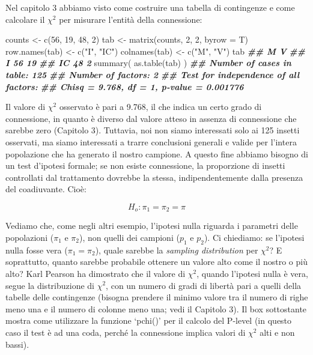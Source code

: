 \documentclass[
  12pt,
]{book}
\newenvironment{Shaded}{\begin{snugshade}}{\end{snugshade}}
\newcommand{\AttributeTok}[1]{\textcolor[rgb]{0.77,0.63,0.00}{#1}}
\newcommand{\DecValTok}[1]{\textcolor[rgb]{0.00,0.00,0.81}{#1}}
\newcommand{\DocumentationTok}[1]{\textcolor[rgb]{0.56,0.35,0.01}{\textbf{\textit{#1}}}}
\newcommand{\FunctionTok}[1]{\textcolor[rgb]{0.00,0.00,0.00}{#1}}
\newcommand{\NormalTok}[1]{#1}
\newcommand{\OtherTok}[1]{\textcolor[rgb]{0.56,0.35,0.01}{#1}}
\newcommand{\StringTok}[1]{\textcolor[rgb]{0.31,0.60,0.02}{#1}}
\begin{document}
Nel capitolo 3 abbiamo visto come costruire una tabella di contingenze e come calcolare il \(\chi^2\) per misurare l'entità della connessione:

\begin{Shaded}
\begin{Highlighting}[]
\NormalTok{counts }\OtherTok{\textless{}{-}} \FunctionTok{c}\NormalTok{(}\DecValTok{56}\NormalTok{, }\DecValTok{19}\NormalTok{, }\DecValTok{48}\NormalTok{, }\DecValTok{2}\NormalTok{)}
\NormalTok{tab }\OtherTok{\textless{}{-}} \FunctionTok{matrix}\NormalTok{(counts, }\DecValTok{2}\NormalTok{, }\DecValTok{2}\NormalTok{, }\AttributeTok{byrow =}\NormalTok{ T)}
\FunctionTok{row.names}\NormalTok{(tab) }\OtherTok{\textless{}{-}} \FunctionTok{c}\NormalTok{(}\StringTok{"I"}\NormalTok{, }\StringTok{"IC"}\NormalTok{)}
\FunctionTok{colnames}\NormalTok{(tab) }\OtherTok{\textless{}{-}} \FunctionTok{c}\NormalTok{(}\StringTok{"M"}\NormalTok{, }\StringTok{"V"}\NormalTok{)}
\NormalTok{tab}
\DocumentationTok{\#\#     M  V}
\DocumentationTok{\#\# I  56 19}
\DocumentationTok{\#\# IC 48  2}
\FunctionTok{summary}\NormalTok{( }\FunctionTok{as.table}\NormalTok{(tab) )}
\DocumentationTok{\#\# Number of cases in table: 125 }
\DocumentationTok{\#\# Number of factors: 2 }
\DocumentationTok{\#\# Test for independence of all factors:}
\DocumentationTok{\#\#  Chisq = 9.768, df = 1, p{-}value = 0.001776}
\end{Highlighting}
\end{Shaded}

Il valore di \(\chi^2\) osservato è pari a 9.768, il che indica un certo grado di connessione, in quanto è diverso dal valore atteso in assenza di connessione che sarebbe zero (Capitolo 3). Tuttavia, noi non siamo interessati solo ai 125 insetti osservati, ma siamo interessati a trarre conclusioni generali e valide per l'intera popolazione che ha generato il nostro campione. A questo fine abbiamo bisogno di un test d'ipotesi formale; se non esiste connessione, la proporzione di insetti controllati dal trattamento dovrebbe la stessa, indipendentemente dalla presenza del coadiuvante. Cioè:

\[H_o :\pi_1  = \pi_2  = \pi\]

Vediamo che, come negli altri esempio, l'ipotesi nulla riguarda i parametri delle popolazioni (\(\pi_1\) e \(\pi_2\)), non quelli dei campioni (\(p_1\) e \(p_2\)). Ci chiediamo: se l'ipotesi nulla fosse vera (\(\pi_1 = \pi_2\)), quale sarebbe la \emph{sampling distribution} per \(\chi^2\)? E soprattutto, quanto sarebbe probabile ottenere un valore alto come il nostro o più alto? Karl Pearson ha dimostrato che il valore di \(\chi^2\), quando l'ipotesi nulla è vera, segue la distribuzione di \(\chi^2\), con un numero di gradi di libertà pari a quelli della tabelle delle contingenze (bisogna prendere il minimo valore tra il numero di righe meno una e il numero di colonne meno una; vedi il Capitolo 3). Il box sottostante mostra come utilizzare la funzione `pchi()' per il calcolo del P-level (in questo caso il test è ad una coda, perché la connessione implica valori di \(\chi^2\) alti e non bassi).
\end{document}
